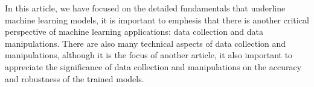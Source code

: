 
\par
In this article, we have focused on the detailed fundamentals that underline machine learning models, it is important to emphesis that there is another critical perspective of machine learning applications: data collection and data manipulations. There are also many technical aspects of data collection and manipulations, although it is the focus of another article, it also important to appreciate the significance of data collection and manipulations on the accuracy and robustness of the trained models.
\par 
